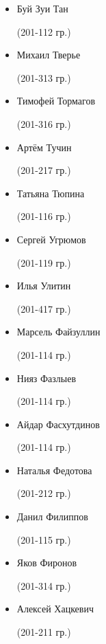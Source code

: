 \begin{multicols}{2}
\begin{small}
\begin{itemize}[leftmargin=0.5em]
	\item[] Буй Зуи Тан\begin{tiny} (201-112 гр.)\end{tiny}
	\item[] Михаил Тверье\begin{tiny} (201-313 гр.)\end{tiny} %
	\item[] Тимофей Тормагов\begin{tiny} (201-316 гр.)\end{tiny} %
	\item[] Артём Тучин\begin{tiny} (201-217 гр.)\end{tiny} %
	\item[] Татьяна Тюпина\begin{tiny} (201-116 гр.)\end{tiny}

	\item[] Сергей Угрюмов\begin{tiny} (201-119 гр.)\end{tiny}
	\item[] Илья Улитин\begin{tiny} (201-417 гр.)\end{tiny}

	\item[] Марсель Файзуллин\begin{tiny} (201-114 гр.)\end{tiny}
	\item[] Нияз Фазлыев\begin{tiny} (201-114 гр.)\end{tiny} %
	\item[] Айдар Фасхутдинов\begin{tiny} (201-114 гр.)\end{tiny} %
	\item[] Наталья Федотова\begin{tiny} (201-212 гр.)\end{tiny}
	\item[] Данил Филиппов\begin{tiny} (201-115 гр.)\end{tiny}
	\item[] Яков Фиронов\begin{tiny} (201-314 гр.)\end{tiny} %

	\item[] Алексей Хацкевич\begin{tiny} (201-211 гр.)\end{tiny}


\end{itemize}
\end{small}
\end{multicols}

